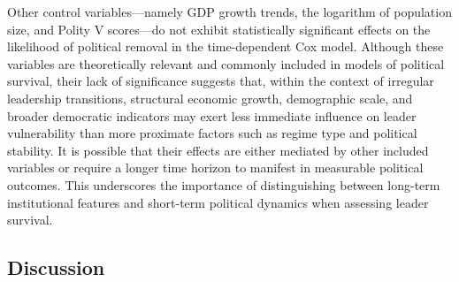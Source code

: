 \documentclass[
  12pt,
]{report}
\begin{document}
Other control variables---namely GDP growth trends, the logarithm of
population size, and Polity V scores---do not exhibit statistically
significant effects on the likelihood of political removal in the
time-dependent Cox model. Although these variables are theoretically
relevant and commonly included in models of political survival, their
lack of significance suggests that, within the context of irregular
leadership transitions, structural economic growth, demographic scale,
and broader democratic indicators may exert less immediate influence on
leader vulnerability than more proximate factors such as regime type and
political stability. It is possible that their effects are either
mediated by other included variables or require a longer time horizon to
manifest in measurable political outcomes. This underscores the
importance of distinguishing between long-term institutional features
and short-term political dynamics when assessing leader survival.

\subsection{Discussion}\label{discussion}
\end{document}
